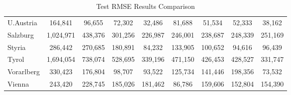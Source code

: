 \documentclass[a4paper,reqno,]{article}
\begin{document}
\begin{enumerate}
\begin{table}[H]
\begin{tabular}{lcccccccc}
        U.Austria & \cellcolor[rgb]{ .973,  .412,  .42}164,841 & \cellcolor[rgb]{ .992,  .718,  .478}96,655 & \cellcolor[rgb]{ .996,  .824,  .502}72,302 & \cellcolor[rgb]{ .592,  .804,  .494}32,486 & \cellcolor[rgb]{ .996,  .784,  .494}81,688 & \cellcolor[rgb]{ 1,  .918,  .518}51,534 & \cellcolor[rgb]{ 1,  .914,  .518}52,333 & \cellcolor[rgb]{ .722,  .839,  .498}38,162 \\
        Salzburg & \cellcolor[rgb]{ .973,  .412,  .42}1,024,971 & \cellcolor[rgb]{ .996,  .8,  .494}438,376 & \cellcolor[rgb]{ 1,  .89,  .514}301,256 & \cellcolor[rgb]{ .388,  .745,  .482}226,987 & \cellcolor[rgb]{ .898,  .89,  .51}246,001 & \cellcolor[rgb]{ .702,  .835,  .498}238,687 & \cellcolor[rgb]{ .961,  .91,  .514}248,339 & \cellcolor[rgb]{ 1,  .922,  .518}251,169 \\
        Styria & \cellcolor[rgb]{ .973,  .412,  .42}286,442 & \cellcolor[rgb]{ .976,  .463,  .431}270,685 & \cellcolor[rgb]{ .992,  .733,  .482}180,891 & \cellcolor[rgb]{ .388,  .745,  .482}84,232 & \cellcolor[rgb]{ 1,  .875,  .51}133,905 & \cellcolor[rgb]{ .69,  .831,  .498}100,652 & \cellcolor[rgb]{ .58,  .8,  .49}94,616 & \cellcolor[rgb]{ .612,  .808,  .494}96,439 \\
        Tyrol & \cellcolor[rgb]{ .973,  .412,  .42}1,694,054 & \cellcolor[rgb]{ .996,  .804,  .498}738,074 & \cellcolor[rgb]{ 1,  .89,  .514}528,695 & \cellcolor[rgb]{ .424,  .753,  .482}339,196 & \cellcolor[rgb]{ 1,  .914,  .518}471,150 & \cellcolor[rgb]{ .878,  .886,  .51}426,453 & \cellcolor[rgb]{ .886,  .886,  .51}428,527 & \cellcolor[rgb]{ .388,  .745,  .482}331,747 \\
        Vorarlberg & \cellcolor[rgb]{ .973,  .412,  .42}330,423 & \cellcolor[rgb]{ .996,  .812,  .498}176,804 & \cellcolor[rgb]{ .643,  .816,  .494}98,707 & \cellcolor[rgb]{ .588,  .8,  .49}93,522 & \cellcolor[rgb]{ .918,  .898,  .51}125,734 & \cellcolor[rgb]{ 1,  .902,  .518}141,446 & \cellcolor[rgb]{ .992,  .757,  .486}198,356 & \cellcolor[rgb]{ .388,  .745,  .482}73,532 \\
        Vienna & \cellcolor[rgb]{ .973,  .412,  .42}243,420 & \cellcolor[rgb]{ .98,  .518,  .443}228,745 & \cellcolor[rgb]{ .996,  .824,  .502}185,026 & \cellcolor[rgb]{ .996,  .847,  .506}181,462 & \cellcolor[rgb]{ .388,  .745,  .482}86,786 & \cellcolor[rgb]{ .918,  .898,  .51}159,606 & \cellcolor[rgb]{ .867,  .882,  .51}152,804 & \cellcolor[rgb]{ .878,  .886,  .51}154,390 \\
        \bottomrule
        \end{tabular}%
      \caption{Test RMSE Results Comparison}

\end{table}
\end{enumerate}
\end{document}
